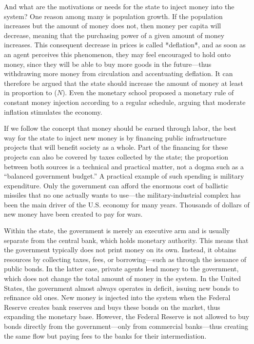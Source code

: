 And what are the motivations or needs for the state to inject money into the system? One reason among many is population growth. If the population increases but the amount of money does not, then money per capita will decrease, meaning that the purchasing power of a given amount of money increases. This consequent decrease in prices is called *deflation*, and as soon as an agent perceives this phenomenon, they may feel encouraged to hold onto money, since they will be able to buy more goods in the future—thus withdrawing more money from circulation and accentuating deflation. It can therefore be argued that the state should increase the amount of money at least in proportion to ($N$). Even the monetary school proposed a monetary rule of constant money injection according to a regular schedule, arguing that moderate inflation stimulates the economy.

If we follow the concept that money should be earned through labor, the best way for the state to inject new money is by financing public infrastructure projects that will benefit society as a whole. Part of the financing for these projects can also be covered by taxes collected by the state; the proportion between both sources is a technical and practical matter, not a dogma such as a “balanced government budget.” A practical example of such spending is military expenditure. Only the government can afford the enormous cost of ballistic missiles that no one actually wants to use—the military-industrial complex has been the main driver of the U.S. economy for many years. Thousands of dollars of new money have been created to pay for wars.

Within the state, the government is merely an executive arm and is usually separate from the central bank, which holds monetary authority. This means that the government typically does not print money on its own. Instead, it obtains resources by collecting taxes, fees, or borrowing—such as through the issuance of public bonds. In the latter case, private agents lend money to the government, which does not change the total amount of money in the system. In the United States, the government almost always operates in deficit, issuing new bonds to refinance old ones. New money is injected into the system when the Federal Reserve creates bank reserves and buys these bonds on the market, thus expanding the monetary base. However, the Federal Reserve is not allowed to buy bonds directly from the government—only from commercial banks—thus creating the same flow but paying fees to the banks for their intermediation.


